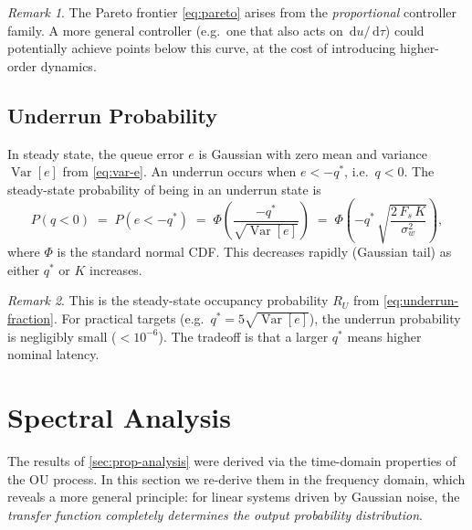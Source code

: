 \documentclass[11pt, a4paper]{article}
\theoremstyle{definition}
\theoremstyle{plain}
\theoremstyle{remark}
\newtheorem{remark}{Remark}[section]
\newcommand{\Var}{\operatorname{Var}}
\newcommand{\dd}{\,\mathrm{d}}                   %
\begin{document}
\begin{remark}
  The Pareto frontier \eqref{eq:pareto} arises from the
  \emph{proportional} controller family.
  A more general controller (e.g.\ one that
  also acts on $\dd u/\dd\tau$) could potentially achieve points
  below this curve, at the cost of introducing higher-order dynamics.
\end{remark}

\subsection{Underrun Probability}\label{sec:underrun-prob}

In steady state, the queue error $e$ is Gaussian with zero mean and
variance $\Var[e]$ from \eqref{eq:var-e}.  An underrun occurs when
$e < -q^*$, i.e.\ $q < 0$.  The steady-state probability of being
in an underrun state is
\begin{equation}\label{eq:underrun-tail}
  P(q < 0)
    \;=\; P(e < -q^*)
    \;=\; \Phi\!\left(\frac{-q^*}{\sqrt{\Var[e]}}\right)
    \;=\; \Phi\!\left(-q^*\,\sqrt{\frac{2\,F_s\,K}{\sigma_w^2}}\right),
\end{equation}
where $\Phi$ is the standard normal CDF.  This decreases rapidly
(Gaussian tail) as either $q^*$ or $K$ increases.

\begin{remark}
  This is the steady-state occupancy probability
  $R_U$ from \cref{eq:underrun-fraction}.  For practical targets
  (e.g.\ $q^* = 5\sqrt{\Var[e]}$), the underrun probability is
  negligibly small ($< 10^{-6}$).  The tradeoff is that a larger
  $q^*$ means higher nominal latency.
\end{remark}

\section{Spectral Analysis}\label{sec:spectral}

The results of \cref{sec:prop-analysis} were derived via the
time-domain properties of the OU process.  In this section we
re-derive them in the frequency domain, which reveals a more general
principle: for linear systems driven by Gaussian noise, the
\emph{transfer function completely determines the output probability
distribution}.

\end{document}
